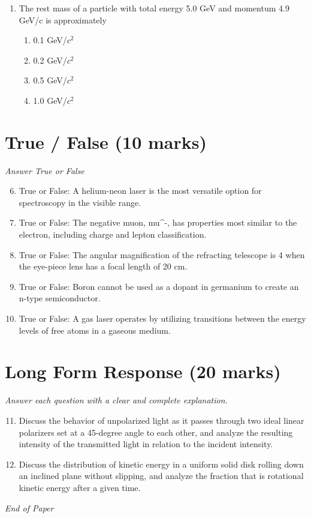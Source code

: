 \documentclass[12pt]{article}
\begin{document}
\begin{enumerate}[label=\arabic*.]
\begin{enumerate}[label=(\alph*)]
    \item Fermions have antisymmetric wave functions and obey the Pauli exclusion principle.
\end{enumerate}
\item The rest mass of a particle with total energy 5.0 GeV and momentum 4.9 GeV/c is approximately
\begin{enumerate}[label=(\alph*)]
    \item 0.1 GeV/$c^2$
    \item 0.2 GeV/$c^2$
    \item 0.5 GeV/$c^2$
    \item 1.0 GeV/$c^2$
\end{enumerate}
\end{enumerate}

\section*{True / False (10 marks)}
\textit{Answer True or False}
\begin{enumerate}[label=\arabic*.]
\setcounter{enumi}{5}
\item True or False: A helium-neon laser is the most versatile option for spectroscopy in the visible range.
\item True or False: The negative muon, mu^-, has properties most similar to the electron, including charge and lepton classification.
\item True or False: The angular magnification of the refracting telescope is 4 when the eye-piece lens has a focal length of 20 cm.
\item True or False: Boron cannot be used as a dopant in germanium to create an n-type semiconductor.
\item True or False: A gas laser operates by utilizing transitions between the energy levels of free atoms in a gaseous medium.
\end{enumerate}

\section*{Long Form Response (20 marks)}
\textit{Answer each question with a clear and complete explanation.}
\begin{enumerate}[label=\arabic*.]
\setcounter{enumi}{10}
\item Discuss the behavior of unpolarized light as it passes through two ideal linear polarizers set at a 45-degree angle to each other, and analyze the resulting intensity of the transmitted light in relation to the incident intensity.
\item Discuss the distribution of kinetic energy in a uniform solid disk rolling down an inclined plane without slipping, and analyze the fraction that is rotational kinetic energy after a given time.
\end{enumerate}

\vfill
\noindent\textit{End of Paper}
\end{document}

